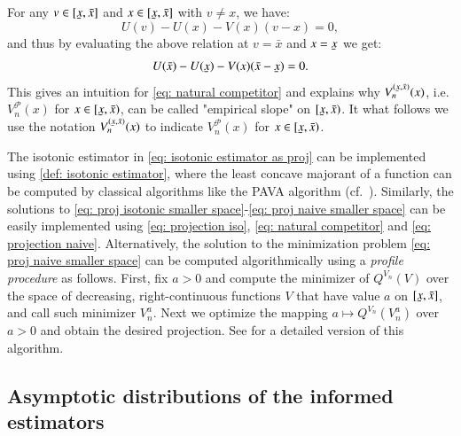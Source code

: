 \begin{remark}
For any $v \in [\ubar{x},\bar{x}]$ and $x \in [\ubar{x},\bar{x}]$ with $v \neq x$, we have:
$$
U(v) - U(x) - V(x)(v-x) = 0,
$$
and thus by evaluating the above relation at $v=\bar{x}$ and $x=\ubar{x}$ we get:
\begin{align}\label{eq: V if F constant}
U(\bar{x}) - U(\ubar{x}) - V(x)(\bar{x}-\ubar{x}) = 0.
\end{align}
This gives an intuition for \eqref{eq: natural competitor} and explains why $V^{(\ubar{x},\bar{x})}_n(x)$, i.e. $V^{\mathscr{P}}_n (x)$ for $x \in [\ubar{x},\bar{x})$, can be called "empirical slope" on $[\ubar{x},\bar{x})$. It what follows we use the notation $V^{(\ubar{x},\bar{x})}_n(x)$ to indicate $V^{\mathscr{P}}_n (x)$ for $x \in [\ubar{x},\bar{x})$.
\end{remark}

The isotonic estimator in \eqref{eq: isotonic estimator as proj} can be implemented using \eqref{def: isotonic estimator}, where the least concave majorant of a function can be computed by classical algorithms like the PAVA algorithm (cf.\ \cite{2}). Similarly, the solutions to \eqref{eq: proj isotonic smaller space}-\eqref{eq: proj naive smaller space} can be easily implemented using \eqref{eq: projection iso}, \eqref{eq: natural competitor} and \eqref{eq: projection naive}. Alternatively, the solution to the minimization problem \eqref{eq: proj naive smaller space} can be computed algorithmically using a \textit{profile procedure} as follows. First, fix $a>0$ and compute the minimizer of $Q^{V_n}(V)$ over the space of decreasing, right-continuous functions $V$ that have value $a$ on $[\ubar{x},\bar{x}]$, and call such minimizer $V^a_n$. Next we optimize the mapping $a \mapsto Q^{V_n}(V^a_n)$ over $a>0$ and obtain the desired projection. See \cite{50} for a detailed version of this algorithm.

\subsection{Asymptotic distributions of the informed estimators}\label{sec: asymp distr}


